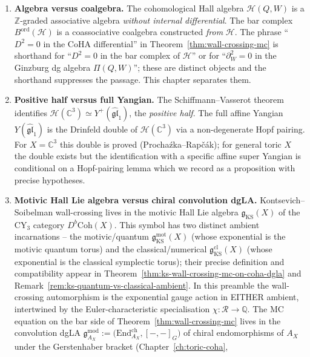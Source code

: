 \begin{enumerate}[label=\textup{(\roman*)}]
 \item \textbf{Algebra versus coalgebra.}
 The cohomological Hall algebra $\mathcal{H}(Q, W)$ is a
 $\mathbb{Z}$-graded associative algebra \emph{without internal
 differential}. The bar complex $B^{\mathrm{ord}}(\mathcal{H})$ is a
 coassociative coalgebra constructed \emph{from} $\mathcal{H}$. The
 phrase ``$D^2 = 0$ in the CoHA differential'' in
 Theorem~\ref{thm:wall-crossing-mc} is shorthand for
 ``$D^2 = 0$ in the bar complex of $\mathcal{H}$'' or for
 ``$\partial_W^2 = 0$ in the Ginzburg dg algebra $\Pi(Q, W)$''; these
 are distinct objects and the shorthand suppresses the passage. This
 chapter separates them.
 \item \textbf{Positive half versus full Yangian.}
 The Schiffmann--Vasserot theorem identifies
 $\mathcal{H}(\mathbb{C}^3) \simeq Y^+(\widehat{\mathfrak{gl}}_1)$,
 the \emph{positive half}. The full affine Yangian
 $Y(\widehat{\mathfrak{gl}}_1)$ is the Drinfeld double of
 $\mathcal{H}(\mathbb{C}^3)$ via a non-degenerate Hopf pairing. For
 $X = \mathbb{C}^3$ this double is proved (Procha\'zka--Rap\v{c}\'ak);
 for general toric $X$ the double exists but the identification
 with a specific affine super Yangian is conditional on a Hopf-pairing
 lemma which we record as a proposition with precise hypotheses.
 \item \textbf{Motivic Hall Lie algebra versus chiral convolution dgLA.}
 Kontsevich--Soibelman wall-crossing lives in the motivic Hall Lie
 algebra $\mathfrak{g}_{\mathrm{KS}}(X)$ of the CY$_3$ category
 $D^b\mathrm{Coh}(X)$. This symbol has two distinct ambient
 incarnations -- the motivic/quantum
 $\mathfrak{g}_{\mathrm{KS}}^{\mathrm{mot}}(X)$ (whose exponential is
 the motivic quantum torus) and the classical/numerical
 $\mathfrak{g}_{\mathrm{KS}}^{\mathrm{cl}}(X)$ (whose exponential is
 the classical symplectic torus); their precise definition and
 compatibility appear in
 Theorem~\ref{thm:ks-wall-crossing-mc-on-coha-dgla} and
 Remark~\ref{rem:ks-quantum-vs-classical-ambient}.
 In this preamble the wall-crossing automorphism is the exponential
 gauge action in EITHER ambient, intertwined by the Euler-characteristic
 specialisation $\chi \colon \mathcal{R} \to \mathbb{Q}$.
 The MC equation on the bar side of
 Theorem~\ref{thm:wall-crossing-mc} lives in the convolution dgLA
 $\mathfrak{g}^{\mathrm{mod}}_{A_X} :=
 \bigl(\mathrm{End}^{\mathrm{ch}}_{A_X}, [-,-]_G\bigr)$
 of chiral endomorphisms of $A_X$ under the Gerstenhaber bracket
 (Chapter~\ref{ch:toric-coha},

\end{enumerate}
